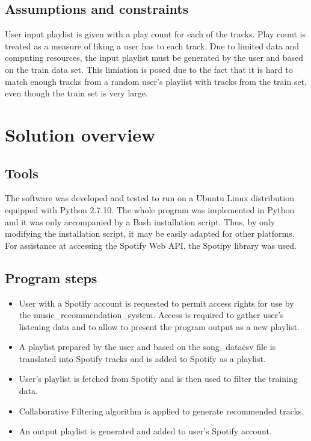 \documentclass{article}
\numberwithin{equation}{section}		%
\numberwithin{figure}{section}			%
\numberwithin{table}{section}				%
\begin{document}
\subsection{Assumptions and constraints}
User input playlist is given with a play count for each of the tracks. Play count is treated as a measure of liking a user has to each track.
Due to limited data and computing resources, the input playlist must be generated by the user and based on the train data set. This limiation is posed due to the fact that it is hard to match enough tracks from a random user's playlist with tracks from the train set, even though the train set is very large.

\section{Solution overview}

\subsection{Tools}
The software was developed and tested to run on a Ubuntu Linux distribution equipped with Python 2.7.10.
The whole program was implemented in Python and it was only accompanied by a Bash installation script. Thus, by only modifying the installation script, it may be easily adapted for other platforms.
For assistance at accessing the Spotify Web API, the Spotipy library was used.

\subsection{Program steps}
\begin{itemize}
\item User with a Spotify account is requested to permit access rights for use by the music\_recommendation\_system. Access is required to gather user's listening data and to allow to present the program output as a new playlist.
\item A playlist prepared by the user and based on the song\_data\.csv file is translated into Spotify tracks and is added to Spotify as a playlist.
\item User's playlist is fetched from Spotify and is then used to filter the training data.
\item Collaborative Filtering algorithm is applied to generate recommended tracks.
\item An output playlist is generated and added to user's Spotify account.
\end{itemize}
\end{document}

